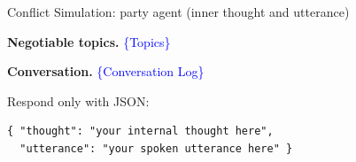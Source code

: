 \begin{table}[p]
\begin{promptbox}{Conflict Simulation: party agent (inner thought and utterance)}
\begin{userbox}
\smallskip
\textbf{Negotiable topics.} \textcolor{blue}{\{Topics\}}

\smallskip
\textbf{Conversation.} \textcolor{blue}{\{Conversation Log\}}

\smallskip
Respond only with JSON:
\begin{verbatim}
{ "thought": "your internal thought here",
  "utterance": "your spoken utterance here" }
\end{verbatim}
\end{userbox}
\end{promptbox}
\vspace{-0.25cm}
\caption{Prompt for persona-conditioned party simulation.}
\vspace{-0.3cm}
\label{tab:prompt-party}
\end{table}
\clearpage


